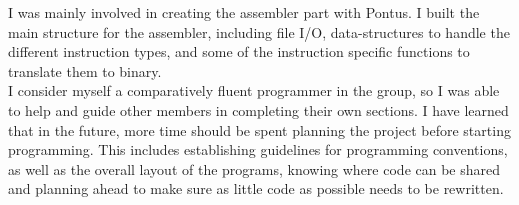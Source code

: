 I was mainly involved in creating the assembler part with Pontus. I built the main structure for the assembler, including file I/O, data-structures to handle the different instruction types, and some of the instruction specific functions to translate them to binary. 
~\\

I consider myself a comparatively fluent programmer in the group, so I was able to help and guide other members in completing their own sections. I have learned that in the future, more time should be spent planning the project before starting programming. This includes establishing guidelines for programming conventions, as well as the overall layout of the programs, knowing where code can be shared and planning ahead to make sure as little code as possible needs to be rewritten.
